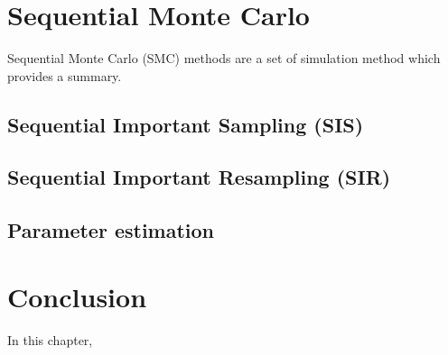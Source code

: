 \section{Sequential Monte Carlo}
Sequential Monte Carlo (SMC) methods are a set of simulation method which provides a summary.


\subsection{Sequential Important Sampling (SIS)}

\subsection{Sequential Important Resampling (SIR)}

\subsection{Parameter estimation}


\section{Conclusion}
In this chapter, 

